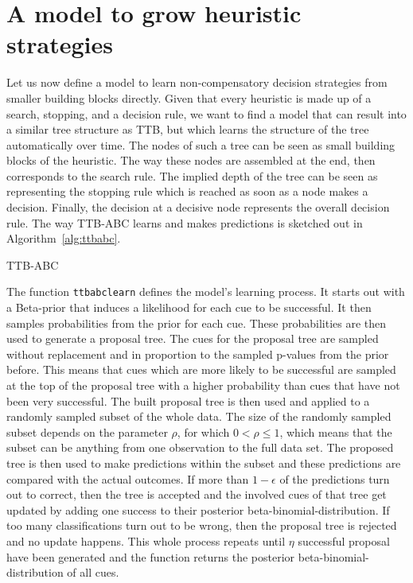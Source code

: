 \documentclass[a4paper,man, natbib]{apa6}
\begin{document}
\section{A model to grow heuristic strategies}
Let us now define a model to learn non-compensatory decision strategies from smaller building blocks directly. Given that every heuristic is made up of a search, stopping, and a decision rule, we want to find a model that can result into a similar tree structure as TTB, but which learns the structure of the tree automatically over time. The nodes of such a tree can be seen as small building blocks of the heuristic.  The way these nodes are assembled at the end, then corresponds to the search rule. The implied depth of the tree can be seen as representing the stopping rule which is reached as soon as a node makes a decision. Finally, the decision at a decisive node represents the overall decision rule. The way TTB-ABC learns and makes predictions is sketched out in Algorithm~\ref{alg:ttbabc}.\\

\FloatBarrier
\begin{algorithm}
\caption{TTB-ABC}
\label{alg:ttbabc}

\end{algorithm}
\FloatBarrier

The function \texttt{ttbabclearn} defines the model's learning process. It starts out with a Beta-prior that induces a likelihood for each cue to be successful. It then samples probabilities from the prior for each cue. These probabilities are then used to generate a proposal tree. The cues for the proposal tree are sampled without replacement and in proportion to the sampled p-values from the prior before. This means that cues which are more likely to be successful are sampled at the top of the proposal tree with a higher probability than cues that have not been very successful. The built proposal tree is then used and applied to a randomly sampled subset of the whole data. The size of the randomly sampled subset depends on the parameter $\rho$, for which $0<\rho\leq1$, which means that the subset can be anything from one observation to the full data set. The proposed tree is then used to make predictions within the subset and these predictions are compared with the actual outcomes. If more than $1-\epsilon$ of the predictions turn out to correct, then the tree is accepted and the involved cues of that tree get updated by adding one success to their posterior beta-binomial-distribution. If too many classifications turn out to be wrong, then the proposal tree is rejected and no update happens. This whole process repeats until $\eta$ successful proposal have been generated and the function returns the posterior beta-binomial-distribution of all cues.
\end{document}
